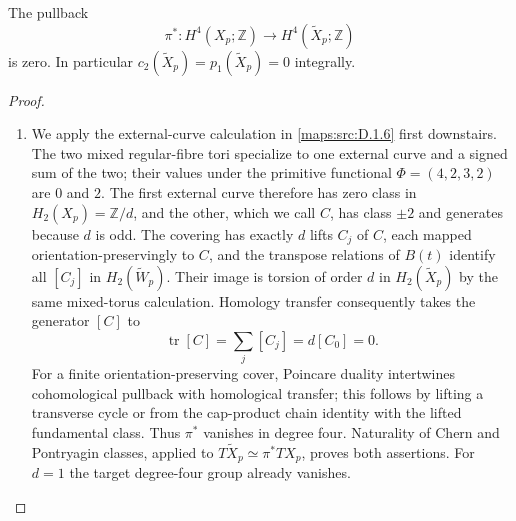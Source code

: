 \begin{theorem}\label{maps:src:D.1.8}


The pullback
\[
 \pi^*:H^4(X_p;\mathbb Z)\longrightarrow
 H^4(\widetilde X_p;\mathbb Z)
\]
is zero. In particular
$c_2(\widetilde X_p)=p_1(\widetilde X_p)=0$ integrally.
\end{theorem}


\begin{proof}
\begin{enumerate}[label=\arabic*.,leftmargin=*]
\item We apply the external-curve calculation in \ref{maps:src:D.1.6} first downstairs.
The two mixed regular-fibre tori specialize to one external curve
and a signed sum of the two; their values under the primitive
functional $\Phi=(4,2,3,2)$ are $0$ and $2$.
The first external curve therefore has zero class in
$H_2(X_p)=\mathbb Z/d$, and the other, which we call $C$, has
class $\pm2$ and generates because $d$ is odd.
The covering has exactly $d$ lifts $C_j$ of $C$, each mapped
orientation-preservingly to $C$, and the transpose relations of
$B(t)$ identify all $[C_j]$ in $H_2(\widetilde W_p)$.
Their image is torsion of order $d$ in $H_2(\widetilde X_p)$
by the same mixed-torus calculation. Homology transfer consequently
takes the generator $[C]$ to
\[
 \operatorname{tr}[C]=\sum_j[C_j]=d[C_0]=0.
\]
For a finite orientation-preserving cover, Poincare duality
intertwines cohomological pullback with homological transfer;
this follows by lifting a transverse cycle or from the cap-product
chain identity with the lifted fundamental class. Thus $\pi^*$
vanishes in degree four. Naturality of Chern and Pontryagin
classes, applied to $T\widetilde X_p\simeq\pi^*TX_p$, proves
both assertions. For $d=1$ the target degree-four group already
vanishes.
\end{enumerate}
\end{proof}

